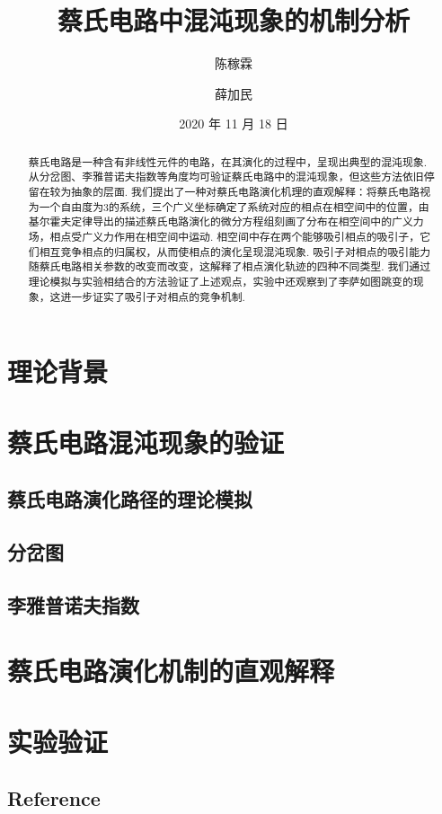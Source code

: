 \documentclass[a4paper, 10pt]{article}
\begin{document}
\title{蔡氏电路中混沌现象的机制分析}
\author{陈稼霖\and 薛加民}
\date{2020 年 11 月 18 日}
\maketitle
\begin{abstract}
蔡氏电路是一种含有非线性元件的电路，在其演化的过程中，呈现出典型的混沌现象. 从分岔图、李雅普诺夫指数等角度均可验证蔡氏电路中的混沌现象，但这些方法依旧停留在较为抽象的层面. 我们提出了一种对蔡氏电路演化机理的直观解释：将蔡氏电路视为一个自由度为$3$的系统，三个广义坐标确定了系统对应的相点在相空间中的位置，由基尔霍夫定律导出的描述蔡氏电路演化的微分方程组刻画了分布在相空间中的广义力场，相点受广义力作用在相空间中运动. 相空间中存在两个能够吸引相点的吸引子，它们相互竞争相点的归属权，从而使相点的演化呈现混沌现象. 吸引子对相点的吸引能力随蔡氏电路相关参数的改变而改变，这解释了相点演化轨迹的四种不同类型. 我们通过理论模拟与实验相结合的方法验证了上述观点，实验中还观察到了李萨如图跳变的现象，这进一步证实了吸引子对相点的竞争机制.
\end{abstract}

\begin{multicols*}{2}

\section{理论背景}

\section{蔡氏电路混沌现象的验证}

\subsection{蔡氏电路演化路径的理论模拟}

\subsection{分岔图}

\subsection{李雅普诺夫指数}

\section{蔡氏电路演化机制的直观解释}

\section{实验验证}

\begin{appendix}
\section*{Reference}
\nocite{*}


    \end{appendix}
\end{multicols*}
\end{document}
